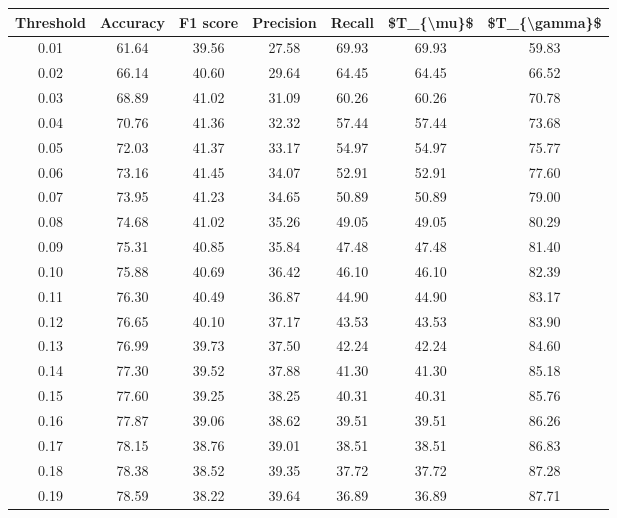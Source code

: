 \begin{tabular}{|c|c|c|c|c|c|c|}
\hline
 Threshold &  Accuracy &  F1 score &  Precision &  Recall &  \$T\_\{\textbackslash mu\}\$ &  \$T\_\{\textbackslash gamma\}\$ \\
\hline
      0.01 &     61.64 &     39.56 &      27.58 &   69.93 &      69.93 &         59.83 \\
      0.02 &     66.14 &     40.60 &      29.64 &   64.45 &      64.45 &         66.52 \\
      0.03 &     68.89 &     41.02 &      31.09 &   60.26 &      60.26 &         70.78 \\
      0.04 &     70.76 &     41.36 &      32.32 &   57.44 &      57.44 &         73.68 \\
      0.05 &     72.03 &     41.37 &      33.17 &   54.97 &      54.97 &         75.77 \\
      0.06 &     73.16 &     41.45 &      34.07 &   52.91 &      52.91 &         77.60 \\
      0.07 &     73.95 &     41.23 &      34.65 &   50.89 &      50.89 &         79.00 \\
      0.08 &     74.68 &     41.02 &      35.26 &   49.05 &      49.05 &         80.29 \\
      0.09 &     75.31 &     40.85 &      35.84 &   47.48 &      47.48 &         81.40 \\
      0.10 &     75.88 &     40.69 &      36.42 &   46.10 &      46.10 &         82.39 \\
      0.11 &     76.30 &     40.49 &      36.87 &   44.90 &      44.90 &         83.17 \\
      0.12 &     76.65 &     40.10 &      37.17 &   43.53 &      43.53 &         83.90 \\
      0.13 &     76.99 &     39.73 &      37.50 &   42.24 &      42.24 &         84.60 \\
      0.14 &     77.30 &     39.52 &      37.88 &   41.30 &      41.30 &         85.18 \\
      0.15 &     77.60 &     39.25 &      38.25 &   40.31 &      40.31 &         85.76 \\
      0.16 &     77.87 &     39.06 &      38.62 &   39.51 &      39.51 &         86.26 \\
      0.17 &     78.15 &     38.76 &      39.01 &   38.51 &      38.51 &         86.83 \\
      0.18 &     78.38 &     38.52 &      39.35 &   37.72 &      37.72 &         87.28 \\
      0.19 &     78.59 &     38.22 &      39.64 &   36.89 &      36.89 &         87.71 \\

\end{tabular}
